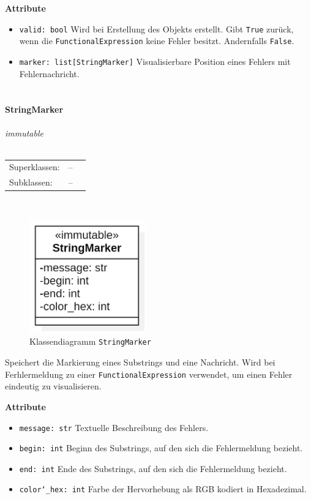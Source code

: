 \documentclass{article}
\newcommand{\classheader}[2][]{\paragraph{#2}
\mbox{}\textit{#1}\\\\}
\begin{document}
\textbf{Attribute}
\begin{itemize}
\item \texttt{valid: bool} \newline Wird bei Erstellung des Objekts erstellt. Gibt \texttt{True} zurück, wenn die \texttt{FunctionalExpression} keine Fehler besitzt. Andernfalls \texttt{False}.
\item \texttt{marker: list[StringMarker]} \newline Visualisierbare Position eines Fehlers mit Fehlernachricht.
\\\\
\end{itemize}


\newpage
\classheader[\flqq{}immutable\frqq]{StringMarker}\label{cls:StringMarker}
\begin{tabular}{lll}
 Superklassen: & --\\
 Subklassen: & --\\
\end{tabular}\\
\begin{figure}[H]%
    \centering
    \includegraphics[width=5cm]{entwurf/Entwurf_dokument/img/cls/model/StringMarker.png}
    \caption{Klassendiagramm \texttt{StringMarker}}
\end{figure}

Speichert die Markierung eines Substrings und eine Nachricht. Wird bei Ferhlermeldung zu einer \texttt{FunctionalExpression} verwendet, um einen Fehler eindeutig zu visualisieren.
\newline \newline

\textbf{Attribute}
\begin{itemize}
\item \texttt{message: str} \newline Textuelle Beschreibung des Fehlers.
\item \texttt{begin: int} \newline Beginn des Substrings, auf den sich die Fehlermeldung bezieht.
\item \texttt{end: int} \newline Ende des Substrings, auf den sich die Fehlermeldung bezieht.
\item \texttt{color\char`_hex: int} \newline Farbe der Hervorhebung als RGB kodiert in Hexadezimal.
\\\\
\end{itemize}
\end{document}
